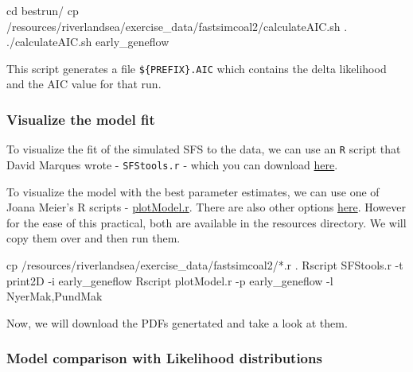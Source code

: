 \documentclass[
  letterpaper,
  DIV=11,
  numbers=noendperiod]{scrartcl}
\newenvironment{Shaded}{\begin{snugshade}}{\end{snugshade}}
\newcommand{\NormalTok}[1]{\textcolor[rgb]{0.00,0.23,0.31}{#1}}
\begin{document}
\begin{Shaded}
\begin{Highlighting}[]
\NormalTok{cd bestrun/}
\NormalTok{cp /resources/riverlandsea/exercise\_data/fastsimcoal2/calculateAIC.sh .}
\NormalTok{./calculateAIC.sh early\_geneflow}
\end{Highlighting}
\end{Shaded}

This script generates a file \texttt{\$\{PREFIX\}.AIC} which contains
the delta likelihood and the AIC value for that run.

\hypertarget{visualize-the-model-fit}{%
\subsubsection{Visualize the model fit}\label{visualize-the-model-fit}}

To visualize the fit of the simulated SFS to the data, we can use an
\texttt{R} script that David Marques wrote - \texttt{SFStools.r} - which
you can download \href{https://github.com/marqueda/SFS-scripts/}{here}.

To visualize the model with the best parameter estimates, we can use one
of Joana Meier's R scripts -
\href{https://github.com/speciationgenomics/scripts/blob/master/plotModel.r}{plotModel.r}.
There are also other options
\href{http://cmpg.unibe.ch/software/fastsimcoal27/additionalScripts.html}{here}.
However for the ease of this practical, both are available in the
resources directory. We will copy them over and then run them.

\begin{Shaded}
\begin{Highlighting}[]
\NormalTok{cp /resources/riverlandsea/exercise\_data/fastsimcoal2/*.r .}
\NormalTok{Rscript SFStools.r {-}t print2D {-}i early\_geneflow}
\NormalTok{Rscript plotModel.r {-}p early\_geneflow {-}l NyerMak,PundMak}
\end{Highlighting}
\end{Shaded}

Now, we will download the PDFs genertated and take a look at them.

\hypertarget{model-comparison-with-likelihood-distributions}{%
\subsubsection{Model comparison with Likelihood
distributions}\label{model-comparison-with-likelihood-distributions}}
\end{document}
